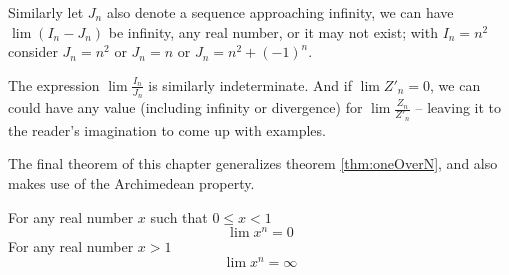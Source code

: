 Similarly let $J_n$ also denote a sequence approaching infinity, we can have $\lim (I_n-J_n)$ be infinity, any real number, or it may not exist; with $I_n = n^2$ consider $J_n = n^2$ or $J_n=n$ or $J_n = n^2 + (-1)^n$.

The expression $\lim \frac{I_n}{J_n}$ is similarly indeterminate. And if $\lim Z'_n=0$, we can could have any value (including infinity or divergence) for $\lim  \frac{Z_n}{Z'_n}$ -- leaving it to the reader's imagination to come up with examples.

The final theorem of this chapter generalizes theorem \ref{thm:oneOverN}, and also makes use of the Archimedean property.

\begin{thm}\label{thm:geometricLim}
For any real number $x$ such that $0 \leq x < 1$
\[
\lim x^n = 0
\]
For any real number $x > 1$
\[
\lim x^n = \infty
\]
\end{thm}

